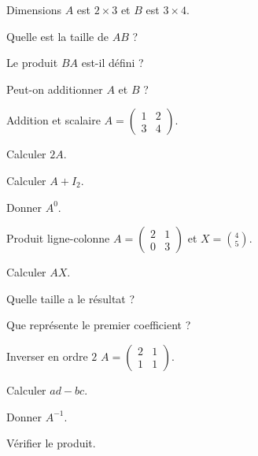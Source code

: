 \exercices
{}
\begingroup\renewcommand{\otBesoinPlace}[1]{}\begin{minipage}{\linewidth}
\begin{exercice}[1]{Dimensions}
$A$ est $2\times3$ et $B$ est $3\times4$.
\begin{questions}
\item Quelle est la taille de $AB$ ?
\item Le produit $BA$ est-il défini ?
\item Peut-on additionner $A$ et $B$ ?
\end{questions}
\end{exercice}
\begin{exercice}[1]{Addition et scalaire}
$A=\begin{pmatrix}1&2\\3&4\end{pmatrix}$.
\begin{questions}
\item Calculer $2A$.
\item Calculer $A+I_2$.
\item Donner $A^0$.
\end{questions}
\end{exercice}
\begin{exercice}[1]{Produit ligne-colonne}
$A=\begin{pmatrix}2&1\\0&3\end{pmatrix}$ et $X=\binom45$.
\begin{questions}
\item Calculer $AX$.
\item Quelle taille a le résultat ?
\item Que représente le premier coefficient ?
\end{questions}
\end{exercice}
\begin{exercice}[1]{Inverser en ordre $2$}
$A=\begin{pmatrix}2&1\\1&1\end{pmatrix}$.
\begin{questions}
\item Calculer $ad-bc$.
\item Donner $A^{-1}$.
\item Vérifier le produit.
\end{questions}
\end{exercice}
\end{minipage}\endgroup

